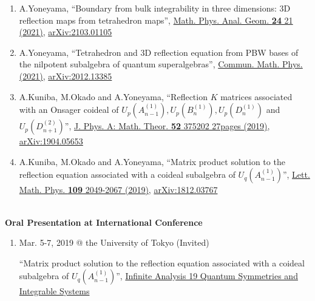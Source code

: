 \documentclass[dvipdfmx]{jsarticle}
\begin{document}
\begin{enumerate}
\renewcommand*\theenumi{\the\numexpr\value{paperCounter}-\value{enumi}}
\setcounter{paperCounter}{5}
\item
A.Yoneyama, ``Boundary from bulk integrability in three dimensions: 3D reflection maps from tetrahedron maps'', \href{https://doi.org/10.1007/s11040-021-09393-3}{Math. Phys. Anal. Geom. {\bf 24} 21 (2021)}, \href{https://arxiv.org/abs/2103.01105}{arXiv:2103.01105}
%
%
\item
A.Yoneyama, ``Tetrahedron and 3D reflection equation from PBW bases of the nilpotent subalgebra of quantum superalgebras'', \href{https://doi.org/10.1007/s00220-021-04098-8}{Commun. Math. Phys. (2021)}, \href{https://arxiv.org/abs/2012.13385}{arXiv:2012.13385}
%
%
\item
A.Kuniba, M.Okado and A.Yoneyama, ``Reflection $K$ matrices associated with an Onsager coideal of $U_p(A_{n-1}^{(1)}),U_p(B_n^{(1)}),U_p(D_n^{(1)})$ and $U_p(D_{n+1}^{(2)})$'', \href{https://iopscience.iop.org/article/10.1088/1751-8121/ab3715}{J. Phys. A: Math. Theor. {\bf 52} 375202 27pages (2019)}, \href{https://arxiv.org/abs/1904.05653}{arXiv:1904.05653}
%
%
\item
A.Kuniba, M.Okado and A.Yoneyama, ``Matrix product solution to the reflection equation associated with a coideal subalgebra of $U_q(A_{n-1}^{(1)})$'', \href{http://links.springernature.com/f/a/VdNxbTDs8BDjk4rQBBmAjw~~/AABE5gA~/RgRekPU6P0QwaHR0cDovL3d3dy5zcHJpbmdlci5jb20vLS8wL0FXb09qTHhwT3VHTGE4WnNvSjRvVwNzcGNCCgAAusGvXDBnf-5SIHlvbmV5YW1hQGdva3V0YW4uYy51LXRva3lvLmFjLmpwWAQAAAbn}{Lett. Math. Phys. {\bf 109} 2049-2067 (2019)}, \href{https://arxiv.org/abs/1812.03767}{arXiv:1812.03767}
\end{enumerate}
%
%
%
%
{\ }\\
\vspace{3mm}
{\bf\large Oral Presentation at International Conference}
\vspace{-6mm}
\\\hrulefill
\begin{enumerate}
\renewcommand*\theenumi{\the\numexpr\value{paperCounter2}-\value{enumi}}
\setcounter{paperCounter2}{2}
\item
Mar. 5-7, 2019 @ the University of Tokyo (Invited)
\par
``Matrix product solution to the reflection equation associated with a coideal subalgebra of $U_q(A_{n-1}^{(1)})$'', \href{https://sites.google.com/view/ia19/home}{Infinite Analysis 19 Quantum Symmetries and Integrable Systems}
\end{enumerate}
\end{document}
